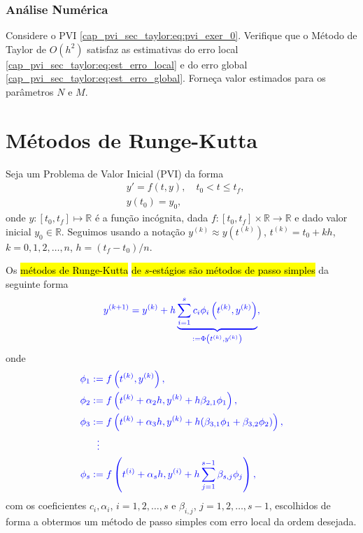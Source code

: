 \subsubsection{Análise Numérica}

\begin{exer}
  Considere o PVI \eqref{cap_pvi_sec_taylor:eq:pvi_exer_0}. Verifique que o Método de Taylor de $O(h^2)$ satisfaz as estimativas do erro local \eqref{cap_pvi_sec_taylor:eq:est_erro_local} e do erro global \eqref{cap_pvi_sec_taylor:eq:est_erro_global}. Forneça valor estimados para os parâmetros $N$ e $M$.
\end{exer}


\section{Métodos de Runge-Kutta}\label{cap_pvi_sec_rk}

Seja um Problema de Valor Inicial (PVI) da forma
\begin{subequations}\label{cap_pvi_sec_rk:eq:pvi}
  \begin{align}
    &y' = f(t, y),\quad t_0 < t \leq t_f,\\
    &y(t_0) = y_0,
  \end{align}
\end{subequations}
onde $y:[t_0, t_f]\mapsto \mathbb{R}$ é a função incógnita, dada $f:[t_0, t_f]\times\mathbb{R}\to\mathbb{R}$ e dado valor inicial $y_0\in\mathbb{R}$. Seguimos usando a notação $y^{(k)} \approx y\left(t^{(k)}\right)$, $t^{(k)} = t_0 + kh$, $k = 0, 1, 2, \dotsc, n$, $h = (t_f-t_0)/n$.

Os \hl{métodos de Runge}{\runge}\hl{-Kutta}{\kutta}\hl{ de $s$-estágios são métodos de passo simples} da seguinte forma
\begin{equation}\color{blue}y^{(k+1)} = y^{(k)} + h\underbrace{\sum_{i=1}^s c_i\phi_i\left(t^{(k)}, y^{(k)}\right)}_{:= \Phi\left(t^{(k)}, y^{(k)}\right)},
\end{equation}
onde
\begin{subequations}\hleq
  \begin{align}
    \phi_1 &:= f\left(t^{(k)}, y^{(k)}\right),\\
    \phi_2 &:= f\left(t^{(k)}+\alpha_2h, y^{(k)}+h\beta_{2,1}\phi_1\right),\\
    \phi_3 &:= f\left(t^{(k)}+\alpha_3h, y^{(k)}+h(\beta_{3,1}\phi_1+\beta_{3,2}\phi_2)\right),\\
        &~~\vdots\nonumber\\
    \phi_s &:= f\left(t^{(i)}+\alpha_sh,y^{(i)}+h\sum_{j=1}^{s-1}\beta_{s,j}\phi_j\right),
  \end{align}
\end{subequations}
com os coeficientes $c_i, \alpha_i$, $i = 1, 2, \dotsc, s$ e $\beta_{i,j}$, $j = 1, 2, \dotsc, s-1$, escolhidos de forma a obtermos um método de passo simples com erro local da ordem desejada.

